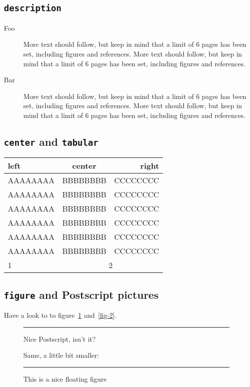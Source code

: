 \documentclass[box,accept]{acmconf}
\begin{document}
\subsection{\texttt{description}}
\begin{description}
\item[Foo] More text should follow, but keep in mind that a limit of 6
     pages has been set, including figures and references.  More text
     should follow, but keep in mind that a limit of 6 pages has been
     set, including figures and references.
\item[Bar] More text should follow, but keep in mind that a limit of 6
     pages has been set, including figures and references.  More text
     should follow, but keep in mind that a limit of 6 pages has been
     set, including figures and references.
\end{description}

\subsection{\texttt{center} and \texttt{tabular}}
\begin{center}
\begin{tabular}{|l|c|r|}\hline
left     & center   & right    \\\hline\hline
AAAAAAAA & BBBBBBBB & CCCCCCCC \\
AAAAAAAA & BBBBBBBB & CCCCCCCC \\\cline{3-3}
AAAAAAAA & BBBBBBBB & CCCCCCCC \\\cline{2-2}
AAAAAAAA & BBBBBBBB & CCCCCCCC \\\cline{1-2}
AAAAAAAA & BBBBBBBB & CCCCCCCC \\\hline
AAAAAAAA & BBBBBBBB & CCCCCCCC \\\hline
1          & \multicolumn{2}{|c|}{2} \\\hline
\end{tabular}
\end{center}

\subsection{\texttt{figure} and Postscript pictures}
Have a look to to figure~\ref{fig-1} and~\ref{fig-2}.

\begin{figure}
\hrule
Nice Postscript, isn't it?
\begin{center}
\end{center}

Same, a little bit smaller:
\begin{center}
\end{center}
\caption{\label{fig-1}This is a nice floating figure}
\hrule
\end{figure}
\end{document}
